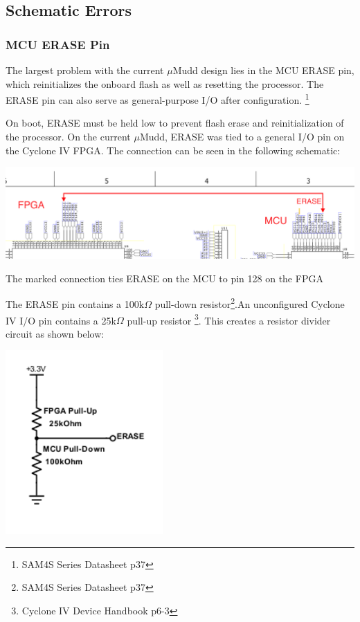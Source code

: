 \documentclass[12pt]{article}
\begin{document}
\subsection{Schematic Errors}

\subsubsection{MCU ERASE Pin}
The largest problem with the current $\mu$Mudd design lies in the MCU ERASE pin, which reinitializes the onboard flash as well as resetting the processor. The ERASE pin can also serve as general-purpose I/O after configuration. \footnote{SAM4S Series Datasheet p37}

On boot, ERASE must be held low to prevent flash erase and reinitialization of the processor. On the current $\mu$Mudd, ERASE was tied to a general I/O pin on the Cyclone IV FPGA. The connection can be seen in the following schematic:

\begin{center}
	\includegraphics[width=16cm]{erase_error.png}
	\caption{The marked connection ties ERASE on the MCU to pin 128 on the FPGA}
\end{center}

The ERASE pin contains a 100k$\Omega$ pull-down resistor\footnote{SAM4S Series Datasheet p37}.An unconfigured Cyclone IV I/O pin contains a 25k$\Omega$ pull-up resistor \footnote{Cyclone IV Device Handbook p6-3}. This creates a resistor divider circuit as shown below:

\begin{center}
	\includegraphics[width=6cm]{resistor_divider.png}
\end{center}
\end{document}
